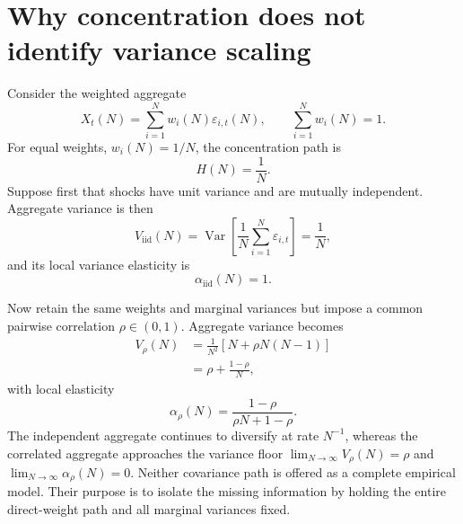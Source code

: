{\section{Why concentration does not identify variance scaling}
\label{sec:concentration_scaling}

Consider the weighted aggregate
\begin{equation}
\label{eq:weighted_aggregate}
    X_t(N)
    =
    \sum_{i=1}^{N}w_i(N)\varepsilon_{i,t}(N),
    \qquad
    \sum_{i=1}^{N}w_i(N)=1.
\end{equation}
For equal weights, $w_i(N)=1/N$, the concentration path is
\begin{equation}
\label{eq:equal_weight_concentration}
    H(N)=\frac{1}{N}.
\end{equation}
Suppose first that shocks have unit variance and are mutually
independent. Aggregate variance is then
\begin{equation}
\label{eq:iid_variance}
    V_{\mathrm{iid}}(N)
    =
    \operatorname{Var}\!\left[
        \frac{1}{N}\sum_{i=1}^{N}\varepsilon_{i,t}
    \right]
    =\frac{1}{N},
\end{equation}
and its local variance elasticity is
\begin{equation}
    \alpha_{\mathrm{iid}}(N)=1.
\end{equation}

Now retain the same weights and marginal variances but impose a common
pairwise correlation $\rho\in(0,1)$. Aggregate variance becomes
\begin{align}
\label{eq:correlated_variance}
    V_{\rho}(N)
    &=
    \frac{1}{N^2}\left[N+\rho N(N-1)\right]
    \nonumber\\
    &=
    \rho+\frac{1-\rho}{N},
\end{align}
with local elasticity
\begin{equation}
\label{eq:correlated_alpha}
    \alpha_{\rho}(N)
    =
    \frac{1-\rho}{\rho N+1-\rho}.
\end{equation}
The independent aggregate continues to diversify at rate $N^{-1}$,
whereas the correlated aggregate approaches the variance floor
$\lim_{N\to\infty}V_{\rho}(N)=\rho$ and
$\lim_{N\to\infty}\alpha_{\rho}(N)=0$. Neither covariance path is offered
as a complete empirical model. Their purpose is to isolate the missing
information by holding the entire direct-weight path and all marginal
variances fixed.

}
